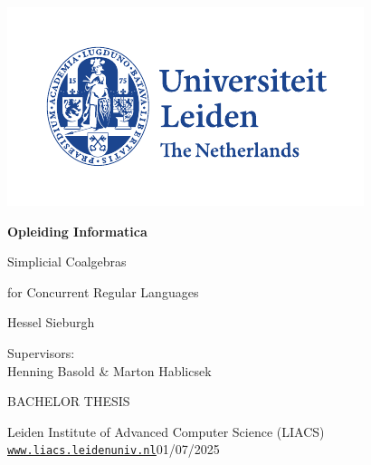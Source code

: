 \thispagestyle{empty}

\includegraphics{logoleiden}

\vspace{-2.5cm}\hfill \begin{huge}\textbf{Opleiding Informatica}\end{huge}

\vspace{5cm}
\begin{Large}
\hfill Simplicial Coalgebras

\vspace*{3mm}

\hfill for Concurrent Regular Languages

\vspace*{14mm}

\hfill Hessel Sieburgh
\end{Large}

\vspace*{6.0cm}

\begin{large}

Supervisors:\\
Henning Basold \& 
Marton Hablicsek


\vspace*{2.8cm}
BACHELOR THESIS

\vspace*{5mm}
Leiden Institute of Advanced Computer Science (LIACS)\\
\href{www.liacs.leidenuniv.nl}{\underline{\texttt{www.liacs.leidenuniv.nl}}}\hfill 01/07/2025
\end{large}

\newpage

